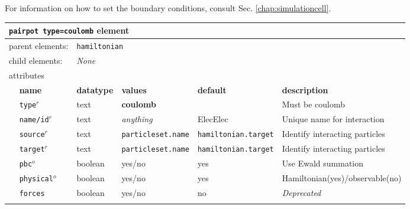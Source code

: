 For information on how to set the boundary conditions, consult Sec. \ref{chap:simulationcell}.


\FloatBarrier
\begin{table}[h]
\begin{center}
\begin{tabularx}{\textwidth}{l l l l l l }
\hline
\multicolumn{6}{l}{\texttt{pairpot type=coulomb} element} \\
\hline
\multicolumn{2}{l}{parent elements:} & \multicolumn{4}{l}{\texttt{hamiltonian}}\\
\multicolumn{2}{l}{child  elements:} & \multicolumn{4}{l}{\textit{None}}\\
\multicolumn{2}{l}{attributes}  & \multicolumn{4}{l}{}\\
   &   \bfseries name     & \bfseries datatype & \bfseries values & \bfseries default   & \bfseries description \\
   & \texttt{type}$^r$    &  text              & \textbf{coulomb} &                     & Must be coulomb     \\
   & \texttt{name/id}$^r$ &  text              & \textit{anything}&  ElecElec           & Unique name for interaction\\
   & \texttt{source}$^r$  &  text              & \texttt{particleset.name} &\texttt{hamiltonian.target}& Identify interacting particles\\
   & \texttt{target}$^r$  &  text              & \texttt{particleset.name} &\texttt{hamiltonian.target}& Identify interacting particles\\
   & \texttt{pbc}$^o$     &  boolean           & yes/no           & yes                 & Use Ewald summation  \\
   & \texttt{physical}$^o$&  boolean           & yes/no           & yes                 & Hamiltonian(yes)/observable(no) \\
\dev{& \texttt{forces}      &  boolean           & yes/no           & no                  & \textit{Deprecated}             \\ }
  \hline
\end{tabularx}
\end{center}
\end{table}
\FloatBarrier

